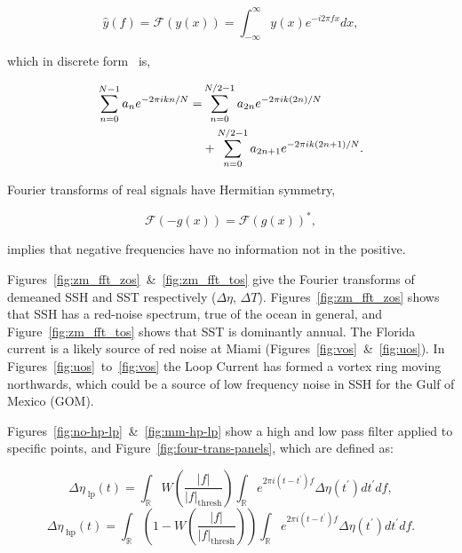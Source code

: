 \begin{equation}
\hat{y}(f) =  \mathcal{F}(y(x))=\int_{-\infty}^{\infty} y(x) e^{-i 2\pi f x} d x,
\end{equation}

which in discrete form~\cite{cooley1965algorithm} is,


\begin{eqnarray}
\sum_{n=0}^{N-1} a_{n} e^{-2 \pi i  k n/ N}=&\sum_{n=0}^{N / 2-1} a_{2 n}
e^{-2 \pi i k (2 n)/ N}  \\ &+\sum_{n=0}^{N / 2-1} a_{2n+1} e^{-2 \pi i k (2 n+1)/ N}. \notag
\end{eqnarray}

Fourier transforms of real signals have Hermitian symmetry,

\begin{equation}
\mathcal{F}{(-g(x))}=\mathcal{F}(g(x))^{*},
\end{equation}

implies that negative frequencies have no information not in the positive.


Figures~\ref{fig:zm_fft_zos}~\&~\ref{fig:zm_fft_tos} give the
Fourier transforms of demeaned SSH and SST respectively ($\Delta \eta$, $\Delta T$).
Figures~\ref{fig:zm_fft_zos} shows that SSH has a red-noise spectrum,
 true of the ocean in general, and Figure~\ref{fig:zm_fft_tos}
shows that SST is dominantly annual.
The Florida current is a likely source of red noise at Miami
(Figures~\ref{fig:vos}~\&~\ref{fig:uos}).
In Figures~\ref{fig:uos}~to~\ref{fig:vos}
the Loop Current has formed a vortex ring moving northwards,
which could be a source of low frequency noise in SSH for the Gulf of Mexico (GOM).

Figures~\ref{fig:no-hp-lp}~\&~\ref{fig:mm-hp-lp} show a high and
low pass filter applied to specific points, and Figure~\ref{fig:four-trans-panels},
which are defined as:

\begin{equation}
\Delta\eta_{\;\mathrm{lp}}(t) = \int_{\mathbb{R}}W\left(\frac{|f|}
{|f|_{\mathrm{thresh}}}\right)\int_{\mathbb{R}}e^{2\pi i (t-t^{\prime})f }
\Delta \eta(t^{\prime})dt^{\prime}df,
\end{equation}
\begin{equation}
\Delta\eta_{\;\mathrm{hp}}(t) = \int_{\mathbb{R}}\left(1-W\left(\frac{|f|}
{|f|_{\mathrm{thresh}}}\right)\right)\int_{\mathbb{R}}e^{2\pi i (t-t^{\prime})f}
   \Delta \eta(t^{\prime})dt^{\prime}df.
\end{equation}

